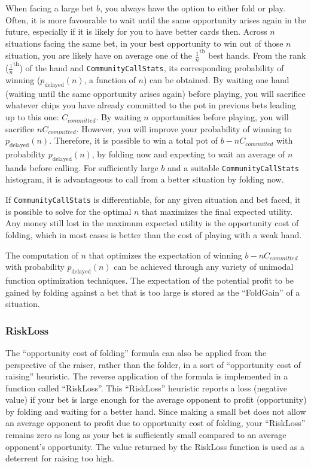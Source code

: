 When facing a large bet $b$, you always have the option to either fold or play.
Often, it is more favourable to wait until the same opportunity arises again in the future, especially if it is likely for you to have better cards then.
Across $n$ situations facing the same bet, in your best opportunity to win out of those $n$ situation, you are likely have on average one of the $\frac{1}{n}^\mathrm{th}$ best hands.
From the rank ($\frac{1}{n}^\mathrm{th}$) of the hand and \texttt{CommunityCallStats}, its corresponding probability of winning ($p_\mathrm{delayed}(n)$, a function of $n$) can be obtained.
By waiting one hand (waiting until the same opportunity arises again) before playing, you will sacrifice whatever chips you have already committed to the pot in previous bets leading up to this one: $C_{committed}$.
By waiting $n$ opportunities before playing, you will sacrifice $n C_{committed}$.
However, you will improve your probability of winning to $p_\mathrm{delayed}(n)$.
Therefore, it is possible to win a total pot of $b-n C_{committed}$ with probability $p_\mathrm{delayed}(n)$, by folding now and expecting to wait an average of $n$ hands before calling.
For sufficiently large $b$ and a suitable \texttt{CommunityCallStats} histogram, it is advantageous to call from a better situation by folding now.

If \texttt{CommunityCallStats} is differentiable, for any given situation and bet faced, it is possible to solve for the optimal $n$ that maximizes the final expected utility.
Any money still lost in the maximum expected utility is the opportunity cost of folding, which in most cases is better than the cost of playing with a weak hand.

The computation of $n$ that optimizes the expectation of winning $b-n C_{committed}$ with probability $p_\mathrm{delayed}(n)$ can be achieved through any variety of unimodal function optimization techniques.
The expectation of the potential profit to be gained by folding against a bet that is too large is stored as the ``FoldGain'' of a situation.

\subsubsection{RiskLoss}
\label{sec:RiskLoss}
The ``opportunity cost of folding'' formula can also be applied from the perspective of the raiser, rather than the folder, in a sort of ``opportunity cost of raising'' heuristic.
The reverse application of the formula is implemented in a function called ``RiskLoss''.
This ``RiskLoss'' heuristic reports a loss (negative value) if your bet is large enough for the average opponent to profit (opportunity) by folding and waiting for a better hand.
Since making a small bet does not allow an average opponent to profit due to opportunity cost of folding, your ``RiskLoss'' remains zero as long as your bet is sufficiently small compared to an average opponent's opportunity.
The value returned by the RiskLoss function is used as a deterrent for raising too high.


